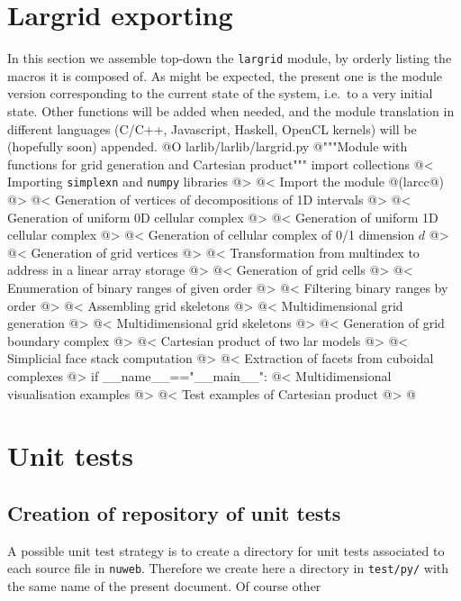 \documentclass[11pt,oneside]{article}	%
\begin{document}
\section{Largrid exporting}
\label{sec:largrid}
In this section we assemble top-down the \texttt{largrid} module, by orderly listing the macros it is composed of. As might be expected, the present one is the module version corresponding to the current state of the system, i.e.~to a very initial state. Other functions will be added when needed, and the module translation in different languages (C/C++, Javascript, Haskell, OpenCL kernels) will be (hopefully soon) appended.
@O larlib/larlib/largrid.py
@{"""Module with functions for grid generation and Cartesian product"""
import collections
@< Importing \texttt{simplexn} and \texttt{numpy} libraries @>
@< Import the module @(larcc@) @>
@< Generation of vertices of decompositions of 1D intervals  @>
@< Generation of uniform 0D cellular complex  @>
@< Generation of uniform 1D cellular complex  @>
@< Generation of cellular complex of 0/1 dimension $d$ @>
@< Generation of grid vertices  @>
@< Transformation from multindex to address in a linear array storage @>
@< Generation of grid cells  @>
@< Enumeration of binary ranges of given order @>
@< Filtering binary ranges by order @>
@< Assembling grid skeletons @>
@< Multidimensional grid generation @>
@< Multidimensional grid skeletons @>
@< Generation of grid boundary complex @>
@< Cartesian product of two lar models   @>
@< Simplicial face stack computation @>
@< Extraction of facets from cuboidal complexes @>
if __name__=="__main__":
	@< Multidimensional visualisation examples @>
	@< Test examples of Cartesian product @>
@}


\section{Unit tests}
\label{sec:tests}

\subsection{Creation of repository of unit tests}

A possible unit test strategy is to create a directory for unit tests associated to each source file in \texttt{nuweb}. Therefore we create here a directory in \texttt{test/py/} with the same name of the present document. Of course other 
\end{document}
